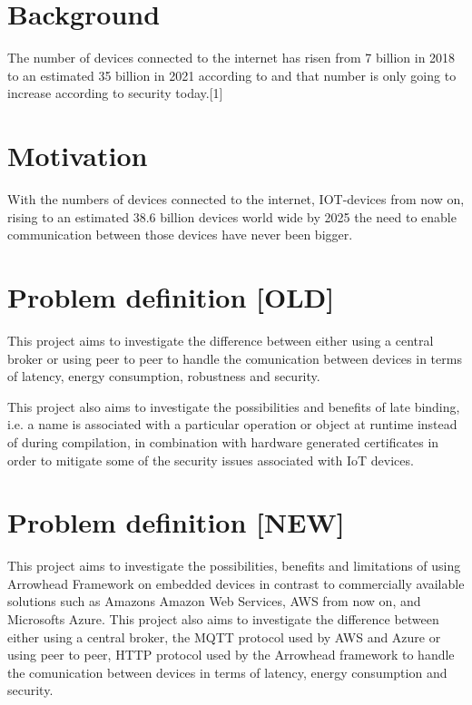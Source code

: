 \section{Background}
The number of devices connected to the internet has risen from 7 billion in 2018 to an estimated 35 billion in 2021 according to and that number is only going to increase
according to security today.[1] %
\section{Motivation}
With the numbers of devices connected to the internet, IOT-devices 
from now on, rising to an estimated 38.6 billion devices world wide
by 2025 the need to enable communication between those devices have
never been bigger.
\section{Problem definition [OLD]}

This project aims to investigate the difference between either 
using a central broker or using peer to peer to handle the comunication 
between devices in terms of latency, energy consumption, robustness and
security. 

This project also aims to investigate the possibilities and benefits of 
late binding, i.e. a name is associated
with a particular operation or object at runtime instead of during 
compilation, in combination with hardware generated certificates  
in order to mitigate some of the security  issues associated with 
IoT devices.

\section{Problem definition [NEW]}
This project aims to investigate the possibilities, benefits and 
limitations of using Arrowhead Framework on embedded devices
in contrast to commercially available solutions such 
as Amazons Amazon Web Services, AWS 
from now on, and Microsofts Azure.  
This project also aims to investigate the difference between either 
using a central broker, the MQTT protocol used by AWS and Azure or using peer to peer, 
HTTP protocol used by the Arrowhead framework to handle the comunication between devices in terms of latency, 
energy consumption and
security.

